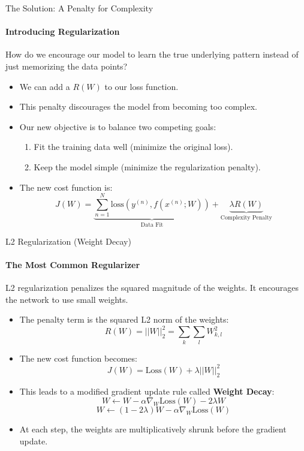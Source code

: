 \begin{frame}{The Solution: A Penalty for Complexity}
    \framesubtitle{Introducing Regularization}
    How do we encourage our model to learn the true underlying pattern instead of just memorizing the data points?
    \begin{itemize}
        \item We can add a  $R(W)$ to our loss function.
        \item This penalty discourages the model from becoming too complex.
        \item Our new objective is to balance two competing goals:
            \begin{enumerate}
                \item Fit the training data well (minimize the original loss).
                \item Keep the model simple (minimize the regularization penalty).
            \end{enumerate}
        \item The new cost function is:
            $$ J(W) = \underbrace{\sum_{n=1}^{N}\text{loss}(y^{(n)}, f(x^{(n)}; W))}_{\text{Data Fit}} + \underbrace{\lambda R(W)}_{\text{Complexity Penalty}} $$
    \end{itemize}
\end{frame}

\begin{frame}{L2 Regularization (Weight Decay)}
    \framesubtitle{The Most Common Regularizer}
    L2 regularization penalizes the squared magnitude of the weights. It encourages the network to use small weights.
    \begin{itemize}
        \item The penalty term is the squared L2 norm of the weights:
            $$ R(W) = ||W||_2^2 = \sum_k \sum_l W_{k,l}^2 $$
        \item The new cost function becomes:
            $$ J(W) = \text{Loss}(W) + \lambda ||W||_2^2 $$
        \item This leads to a modified gradient update rule called \textbf{Weight Decay}:
            $$ W \leftarrow W - \alpha \nabla_W \text{Loss}(W) - 2\lambda W $$
            $$ W \leftarrow (1 - 2\lambda)W - \alpha \nabla_W \text{Loss}(W) $$
        \item At each step, the weights are multiplicatively shrunk before the gradient update.
    \end{itemize}
\end{frame}

